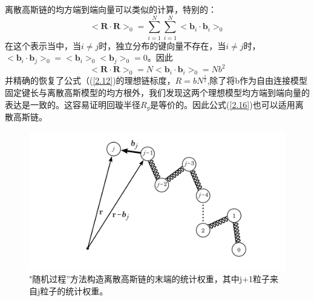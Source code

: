 离散高斯链的均方端到端向量可以类似的计算，特别的：
\begin{equation}\label{2.31}
<\mathbf{R}\cdot\mathbf{R}>_{0}=\sum_{i=1}^{N}\sum_{i=1}^{N}<\mathbf{b}_{i}\cdot\mathbf{b}_{i}>_{0}
\end{equation}
在这个表示当中，当$i\neq j$时，独立分布的键向量不存在，当$i\neq j$时，$<\mathbf{b}_{i}\cdot\mathbf{b}_{j}>_{0}=<\mathbf{b}_{i}>_{0}<\mathbf{b}_{j}>_{0}=0$。因此
\begin{equation}\label{2.32}
<\mathbf{R}\cdot\mathbf{R}>_{0}=N<\mathbf{b}_{i}\cdot\mathbf{b}_{i}>_{0}=Nb^2
\end{equation}
并精确的恢复了公式（(\ref{2.12})的理想链标度，$R=bN^\frac{1}{2}$,除了将b作为自由连接模型固定键长与离散高斯模型的均方根外，我们发现这两个理想模型均方端到端向量的表达是一致的。这容易证明回璇半径$R_{g}$是等价的。因此公式(\ref{2.16})也可以适用离散高斯链。
\begin{figure}[H]
\centering
\includegraphics[width=15cm]{./figures/23.png}
\caption{"随机过程”方法构造离散高斯链的末端的统计权重，其中j+1粒子来自j粒子的统计权重。}
\label{figures23}
\end{figure}


